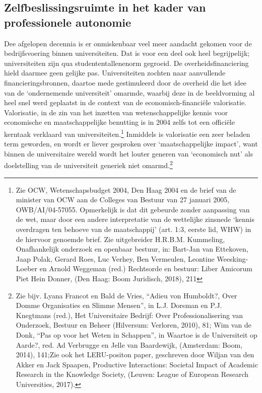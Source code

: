 \documentclass{jote-book}
\begin{document}
	\subsection{Zelfbeslissingsruimte in het kader van professionele autonomie}



	Dee afgelopen decennia is er onmiskenbaar veel meer aandacht gekomen voor de bedrijfsvoering binnen universiteiten. Dat is voor een deel ook heel begrijpelijk; universiteiten zijn qua studententallenenorm gegroeid. De overheidsfinanciering hield daarmee geen gelijke pas. Universiteiten zochten naar aanvullende financieringsbronnen, daartoe mede gestimuleerd door de overheid die het idee van de ‘ondernemende universiteit' omarmde, waarbij deze in de beeldvorming al heel snel werd geplaatst in de context van de economisch-financiële valorisatie. Valorisatie, in de zin van het inzetten van wetenschappelijke kennis voor economische en maatschappelijke benutting is in 2004 zelfs tot een officiële kerntaak verklaard van universiteiten.\footnote{Zie OCW, Wetenschapsbudget 2004, Den Haag 2004 en de brief van de minister van OCW aan de Colleges van Bestuur van 27 januari 2005, OWB/AI/04-57055. Opmerkelijk is dat dit gebeurde zonder aanpassing van de wet, maar door een andere interpretatie van de wettelijke zinsnede ‘kennis overdragen ten behoeve van de maatschappij' (art. 1:3, eerste lid, WHW) in de hiervoor genoemde brief. Zie uitgebreider H.R.B.M. Kummeling, Onafhankelijk onderzoek en openbaar bestuur, in: Bart-Jan van Ettekoven, Jaap Polak, Gerard Roes, Luc Verhey, Ben Vermeulen, Leontine Weesking-Loeber en Arnold Weggeman (red.) Rechtsorde en bestuur: Liber Amicorum Piet Hein Donner, (Den Haag: Boom Juridisch, 2018), 211 } Inmiddels is valorisatie een zeer beladen term geworden, en wordt er liever gesproken over ‘maatschappelijke impact', want binnen de universitaire wereld wordt het louter generen van ‘economisch nut' als doelstelling van de universiteit generiek niet omarmd.\footnote{Zie bijv. Lyana Francot en Bald de Vries, “Adieu von Humboldt?, Over Domme Organisaties en Slimme Mensen”, in L.J. Dorsman en P.J. Knegtmans (red.), Het Universitaire Bedrijf: Over Professionalisering van Onderzoek, Bestuur en Beheer (Hilversum: Verloren, 2010), 81; Wim van de Donk, “Pas op voor het Weten in Schappen”, in Waartoe is de Universiteit op Aarde?, red. Ad Verbrugge en Jelle van Baardewijk, (Amsterdam: Boom, 2014), 141;Zie ook het LERU-positon paper, geschreven door Wiljan van den Akker en Jack Spaapen, Productive Interactions: Societal Impact of Academic Research in the Knowledge Society, (Leuven: League of European Research Universities, 2017).}
\end{document}
